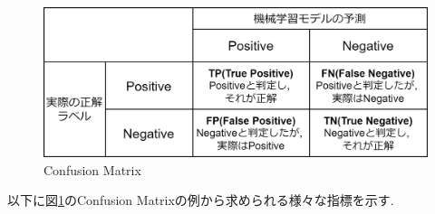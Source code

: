 \documentclass{ltjarticle}
\begin{document}
\begin{figure}[h]
    \centering
    \includegraphics[width = 12cm]{images/Confusion_Matrix.drawio.png}
    \caption{Confusion Matrix}
    \label{fig:Confusion Matrix}
\end{figure}
\vspace{5truept}

\noindent
以下に図\ref{fig:Confusion Matrix}のConfusion Matrixの例から求められる様々な指標を示す. 
\vspace{10truept}
\end{document}
